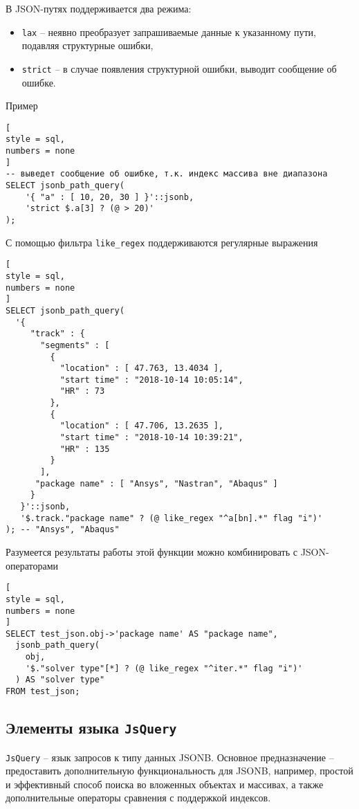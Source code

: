 \documentclass[%
	11pt,
	a4paper,
	utf8,
		]{article}
\begin{document}
В JSON-путях поддерживается два режима:
\begin{itemize}
	\item \texttt{lax} -- неявно преобразует запрашиваемые данные к указанному пути, подавляя структурные ошибки,
	
	\item \texttt{strict} -- в случае появления структурной ошибки, выводит сообщение об ошибке.
\end{itemize}

Пример
\begin{lstlisting}[
style = sql,
numbers = none
]
-- выведет сообщение об ошибке, т.к. индекс массива вне диапазона
SELECT jsonb_path_query(
    '{ "a" : [ 10, 20, 30 ] }'::jsonb,
    'strict $.a[3] ? (@ > 20)'
);
\end{lstlisting}

С помощью фильтра \verb|like_regex| поддерживаются регулярные выражения
\begin{lstlisting}[
style = sql,
numbers = none
]
SELECT jsonb_path_query(
  '{
     "track" : {
       "segments" : [
         {
           "location" : [ 47.763, 13.4034 ],
           "start time" : "2018-10-14 10:05:14",
           "HR" : 73
         },
         {
           "location" : [ 47.706, 13.2635 ],
           "start time" : "2018-10-14 10:39:21",
           "HR" : 135
         }
       ],
      "package name" : [ "Ansys", "Nastran", "Abaqus" ]
     }
   }'::jsonb,
   '$.track."package name" ? (@ like_regex "^a[bn].*" flag "i")'
); -- "Ansys", "Abaqus"
\end{lstlisting}

Разумеется результаты работы этой функции можно комбинировать с JSON-операторами
\begin{lstlisting}[
style = sql,
numbers = none
]
SELECT test_json.obj->'package name' AS "package name",
  jsonb_path_query(
    obj,
    '$."solver type"[*] ? (@ like_regex "^iter.*" flag "i")'
  ) AS "solver type"
FROM test_json;
\end{lstlisting}

\subsection{Элементы языка \texttt{JsQuery}}

\texttt{JsQuery} -- язык запросов к типу данных JSONB. Основное предназначение -- предоставить дополнительную функциональность для JSONB, например, простой и эффективный способ поиска во вложенных объектах и массивах, а также дополнительные операторы сравнения с поддержкой индексов.
\end{document}
